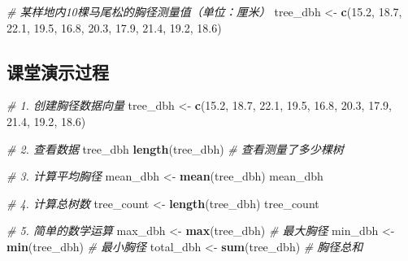 \documentclass[
  twoside]{book}
\newenvironment{Shaded}{\begin{snugshade}}{\end{snugshade}}
\newcommand{\CommentTok}[1]{\textcolor[rgb]{0.56,0.35,0.01}{\textit{#1}}}
\newcommand{\FloatTok}[1]{\textcolor[rgb]{0.00,0.00,0.81}{#1}}
\newcommand{\FunctionTok}[1]{\textcolor[rgb]{0.13,0.29,0.53}{\textbf{#1}}}
\newcommand{\NormalTok}[1]{#1}
\newcommand{\OtherTok}[1]{\textcolor[rgb]{0.56,0.35,0.01}{#1}}
\begin{document}
\begin{Shaded}
\begin{Highlighting}[]
\CommentTok{\# 某样地内10棵马尾松的胸径测量值（单位：厘米）}
\NormalTok{tree\_dbh }\OtherTok{\textless{}{-}} \FunctionTok{c}\NormalTok{(}\FloatTok{15.2}\NormalTok{, }\FloatTok{18.7}\NormalTok{, }\FloatTok{22.1}\NormalTok{, }\FloatTok{19.5}\NormalTok{, }\FloatTok{16.8}\NormalTok{, }\FloatTok{20.3}\NormalTok{, }\FloatTok{17.9}\NormalTok{, }\FloatTok{21.4}\NormalTok{, }\FloatTok{19.2}\NormalTok{, }\FloatTok{18.6}\NormalTok{)}
\end{Highlighting}
\end{Shaded}

\hypertarget{ux8bfeux5802ux6f14ux793aux8fc7ux7a0b}{%
\subsection{课堂演示过程}\label{ux8bfeux5802ux6f14ux793aux8fc7ux7a0b}}

\begin{Shaded}
\begin{Highlighting}[]
\CommentTok{\# 1. 创建胸径数据向量}
\NormalTok{tree\_dbh }\OtherTok{\textless{}{-}} \FunctionTok{c}\NormalTok{(}\FloatTok{15.2}\NormalTok{, }\FloatTok{18.7}\NormalTok{, }\FloatTok{22.1}\NormalTok{, }\FloatTok{19.5}\NormalTok{, }\FloatTok{16.8}\NormalTok{, }\FloatTok{20.3}\NormalTok{, }\FloatTok{17.9}\NormalTok{, }\FloatTok{21.4}\NormalTok{, }\FloatTok{19.2}\NormalTok{, }\FloatTok{18.6}\NormalTok{)}

\CommentTok{\# 2. 查看数据}
\NormalTok{tree\_dbh}
\FunctionTok{length}\NormalTok{(tree\_dbh)  }\CommentTok{\# 查看测量了多少棵树}

\CommentTok{\# 3. 计算平均胸径}
\NormalTok{mean\_dbh }\OtherTok{\textless{}{-}} \FunctionTok{mean}\NormalTok{(tree\_dbh)}
\NormalTok{mean\_dbh}

\CommentTok{\# 4. 计算总树数}
\NormalTok{tree\_count }\OtherTok{\textless{}{-}} \FunctionTok{length}\NormalTok{(tree\_dbh)}
\NormalTok{tree\_count}

\CommentTok{\# 5. 简单的数学运算}
\NormalTok{max\_dbh }\OtherTok{\textless{}{-}} \FunctionTok{max}\NormalTok{(tree\_dbh)  }\CommentTok{\# 最大胸径}
\NormalTok{min\_dbh }\OtherTok{\textless{}{-}} \FunctionTok{min}\NormalTok{(tree\_dbh)  }\CommentTok{\# 最小胸径}
\NormalTok{total\_dbh }\OtherTok{\textless{}{-}} \FunctionTok{sum}\NormalTok{(tree\_dbh)  }\CommentTok{\# 胸径总和}
\end{Highlighting}
\end{Shaded}
\end{document}
